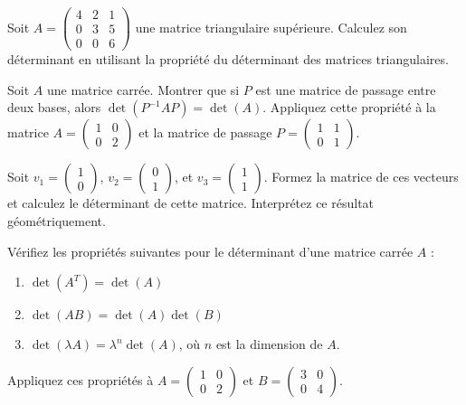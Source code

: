 \begin{exercice}
Soit \( A = \begin{pmatrix} 4 & 2 & 1 \\ 0 & 3 & 5 \\ 0 & 0 & 6 \end{pmatrix} \) une matrice triangulaire supérieure. Calculez son déterminant en utilisant la propriété du déterminant des matrices triangulaires.
\end{exercice}

\begin{exercice}
Soit \( A \) une matrice carrée. Montrer que si \( P \) est une matrice de passage entre deux bases, alors \( \det(P^{-1} A P) = \det(A) \). Appliquez cette propriété à la matrice \( A = \begin{pmatrix} 1 & 0 \\ 0 & 2 \end{pmatrix} \) et la matrice de passage \( P = \begin{pmatrix} 1 & 1 \\ 0 & 1 \end{pmatrix} \).
\end{exercice}

\begin{exercice}
Soit \( v_1 = \begin{pmatrix} 1 \\ 0 \end{pmatrix} \), \( v_2 = \begin{pmatrix} 0 \\ 1 \end{pmatrix} \), et \( v_3 = \begin{pmatrix} 1 \\ 1 \end{pmatrix} \). Formez la matrice de ces vecteurs et calculez le déterminant de cette matrice. Interprétez ce résultat géométriquement.
\end{exercice}

\begin{exercice}
Vérifiez les propriétés suivantes pour le déterminant d'une matrice carrée \( A \) :
\begin{enumerate}
    \item \( \det(A^T) = \det(A) \)
    \item \( \det(AB) = \det(A) \det(B) \)
    \item \( \det(\lambda A) = \lambda^n \det(A) \), où \( n \) est la dimension de \( A \).
\end{enumerate}
Appliquez ces propriétés à \( A = \begin{pmatrix} 1 & 0 \\ 0 & 2 \end{pmatrix} \) et \( B = \begin{pmatrix} 3 & 0 \\ 0 & 4 \end{pmatrix} \).
\end{exercice}

